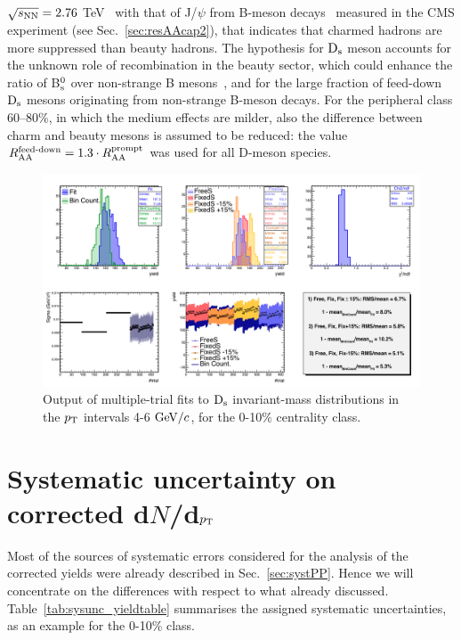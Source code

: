 $\sqrt{s_{\rm NN}} = 2.76$ TeV~\cite{Adam:2015nna} with that of J/$\psi$ from B-meson decays~\cite{Khachatryan:2016ypw} 
measured in the CMS experiment (see Sec.~\ref{sec:resAAcap2}), that indicates that charmed hadrons 
are more suppressed than beauty hadrons. The hypothesis for ${\rm D_s}$ meson
accounts for the unknown role of 
recombination in the beauty sector, which
could enhance the ratio of B$^0_{\rm s}$ over non-strange B mesons~\cite{TAMULHC}, 
and for the large fraction of feed-down ${\rm D_s}$ mesons originating from non-strange B-meson decays.
For the peripheral class 60--80\%, in which the medium effects are milder, 
also the difference between charm and beauty mesons is assumed to be 
reduced: the value $R_{\rm AA}^{\textnormal{feed-down}}=1.3\cdot R_{\rm AA}^{\rm prompt}$ 
was used for all D-meson species. 

\begin{figure}[!htb]
 \begin{center}
\includegraphics[width=15.cm]{./FigCap5/MT_Pt46_010.png}
\end{center}
 \caption{Output of multiple-trial fits to ${\rm D_s}$ invariant-mass distributions in the $p_{\rm T}$ intervals 4-6 $\mathrm{GeV}/c$, for the 0-10$\%$ centrality class.}
 \label{fig:multitrial_Ds_010}
\end{figure}


\section{Systematic uncertainty on corrected d$N$/d$p_{\rm T}$}
\label{sec:systematics}
Most of the sources of systematic errors considered for the analysis 
of the corrected yields were already described in Sec.~\ref{sec:systPP}. 
Hence we will concentrate on the differences with respect to what 
already discussed. Table~\ref{tab:sysunc_yieldtable} summarises the 
assigned systematic uncertainties, as an example for the 0-10\% class. 

